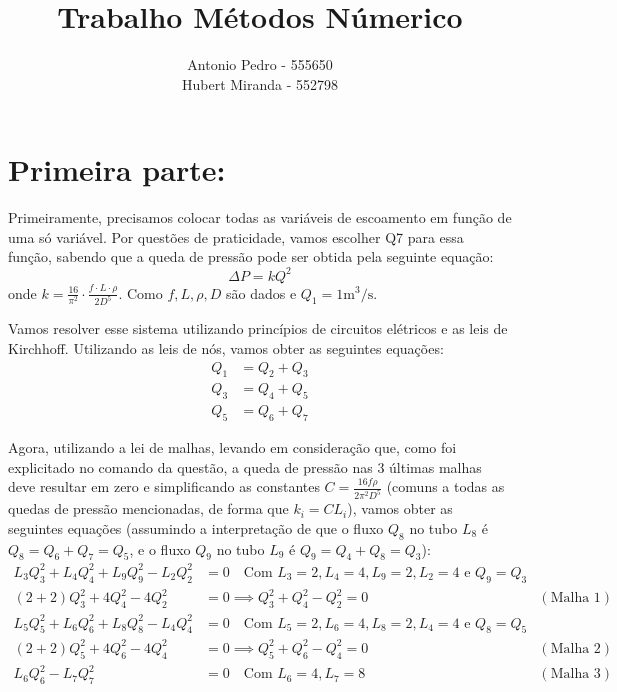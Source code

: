 \documentclass[12pt]{article}
\begin{document}
 
 
\title{Trabalho Métodos Númerico}
\author{Antonio Pedro - 555650 \\ Hubert Miranda - 552798}

\maketitle
\section*{Primeira parte:} 
Primeiramente, precisamos colocar todas as variáveis de escoamento em função de uma só variável. Por questões de praticidade, vamos escolher Q7 para essa função, sabendo que a queda de pressão pode ser obtida pela seguinte equação:
\[ \Delta P = k Q^2 \]
onde $k = \frac{16}{\pi^{2}} \cdot \frac{f \cdot L \cdot \rho}{2D^{5}}$. Como $f, L, \rho, D$ são dados e $Q_1 = 1 \text{m}^3/\text{s}$.

Vamos resolver esse sistema utilizando princípios de circuitos elétricos e as leis de Kirchhoff. Utilizando as leis de nós, vamos obter as seguintes equações:
\begin{align}
Q_1 &= Q_2 + Q_3 \label{eq:no_1} \\
Q_3 &= Q_4 + Q_5 \label{eq:no_2} \\
Q_5 &= Q_6 + Q_7 \label{eq:no_3}
\end{align}

Agora, utilizando a lei de malhas, levando em consideração que, como foi explicitado no comando da questão, a queda de pressão nas 3 últimas malhas deve resultar em zero e simplificando as constantes $C = \frac{16f\rho}{2\pi^2 D^5}$ (comuns a todas as quedas de pressão mencionadas, de forma que $k_i = C L_i$), vamos obter as seguintes equações (assumindo a interpretação de que o fluxo $Q_8$ no tubo $L_8$ é $Q_8 = Q_6+Q_7 = Q_5$, e o fluxo $Q_9$ no tubo $L_9$ é $Q_9 = Q_4+Q_8 = Q_3$):
\begin{align}
L_3 Q_3^2 + L_4 Q_4^2 + L_9 Q_9^2 - L_2 Q_2^2 &= 0 \quad \text{Com } L_3=2, L_4=4, L_9=2, L_2=4 \text{ e } Q_9=Q_3 \nonumber \\
(2+2)Q_3^2 + 4Q_4^2 - 4Q_2^2 &= 0 \implies Q_3^2 + Q_4^2 - Q_2^2 = 0 \quad &(\text{Malha 1}) \label{eq:malha_1} \\
L_5 Q_5^2 + L_6 Q_6^2 + L_8 Q_8^2 - L_4 Q_4^2 &= 0 \quad \text{Com } L_5=2, L_6=4, L_8=2, L_4=4 \text{ e } Q_8=Q_5 \nonumber \\
(2+2)Q_5^2 + 4Q_6^2 - 4Q_4^2 &= 0 \implies Q_5^2 + Q_6^2 - Q_4^2 = 0 \quad &(\text{Malha 2}) \label{eq:malha_2} \\
L_6 Q_6^2 - L_7 Q_7^2 &= 0 \quad \text{Com } L_6=4, L_7=8 \quad &(\text{Malha 3}) \label{eq:malha_3}
\end{align}
\end{document}
